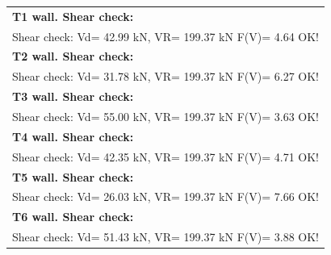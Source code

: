 \tablelasttail{\hline}
\begin{center}
\begin{supertabular}[H]{|l|}
\textbf{T1 wall. Shear check:}\\
  Shear check: Vd=  42.99 kN,  VR= 199.37 kN  F(V)= 4.64 OK!\\
\hline
\textbf{T2 wall. Shear check:}\\
  Shear check: Vd=  31.78 kN,  VR= 199.37 kN  F(V)= 6.27 OK!\\
\hline
\textbf{T3 wall. Shear check:}\\
  Shear check: Vd=  55.00 kN,  VR= 199.37 kN  F(V)= 3.63 OK!\\
\hline
\textbf{T4 wall. Shear check:}\\
  Shear check: Vd=  42.35 kN,  VR= 199.37 kN  F(V)= 4.71 OK!\\
\hline
\textbf{T5 wall. Shear check:}\\
  Shear check: Vd=  26.03 kN,  VR= 199.37 kN  F(V)= 7.66 OK!\\
\hline
\textbf{T6 wall. Shear check:}\\
  Shear check: Vd=  51.43 kN,  VR= 199.37 kN  F(V)= 3.88 OK!\\
\end{supertabular}
\end{center}

